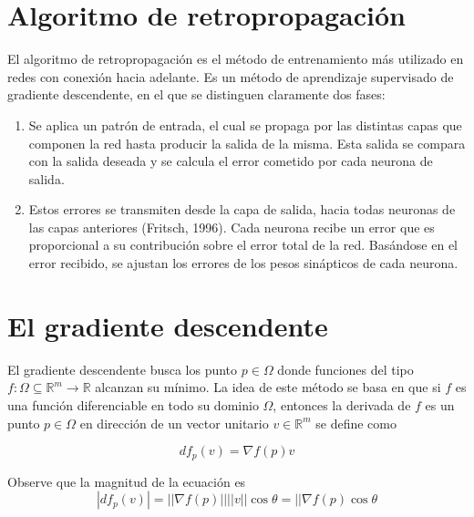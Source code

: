 \section{Algoritmo de retropropagación}
El algoritmo de retropropagación es el método de entrenamiento más utilizado en redes con conexión hacia adelante. Es un método de aprendizaje supervisado de gradiente descendente, en el que se distinguen claramente dos fases:
\begin{enumerate}
	\item Se aplica un patrón de entrada, el cual se propaga por las distintas capas que componen la red hasta producir la salida de la misma. Esta salida se compara con la salida deseada y se calcula el error cometido por cada neurona de salida.

	\item Estos errores se transmiten desde la capa de salida, hacia todas neuronas de las capas anteriores (Fritsch, 1996). Cada neurona recibe un error que es proporcional a su contribución sobre el error total de la red. Basándose en el error recibido, se ajustan los errores de los pesos sinápticos de cada neurona.
\end{enumerate}








\section{El gradiente descendente}%
El gradiente descendente busca los punto $p \in \Omega$ donde funciones del tipo $f: \Omega\subseteq\mathbb{R}^m \rightarrow \mathbb{R}$ alcanzan su mínimo. La idea de este método se basa en que si $f$ es una función diferenciable en todo su dominio $\Omega$, entonces la derivada de $f$ es un punto $p \in \Omega$ en dirección de un vector unitario $v \in \mathbb{R}^m$ se define como

$$ df_{p}(v) = \nabla f(p)v $$

Observe que la magnitud de la ecuación es
$$ |d f_{p}(v)| = ||\nabla f(p)|| ||v||\cos\theta = ||\nabla f(p)\cos\theta$$

